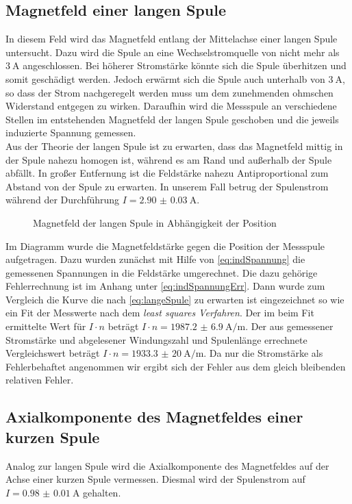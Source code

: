 \subsection{Magnetfeld einer langen Spule}
In diesem Feld wird das Magnetfeld entlang der Mittelachse einer langen Spule untersucht. Dazu wird die Spule an eine Wechselstromquelle von nicht mehr als $ \SI{3}{\ampere} $ angeschlossen. Bei höherer Stromstärke könnte sich die Spule überhitzen und somit geschädigt werden. Jedoch erwärmt sich die Spule auch unterhalb von $ \SI{3}{\ampere} $, so dass der Strom nachgeregelt werden muss um dem zunehmenden ohmschen Widerstand entgegen zu wirken. Daraufhin wird die Messspule an verschiedene Stellen im entstehenden Magnetfeld der langen Spule geschoben und die jeweils induzierte Spannung gemessen. \\
Aus der Theorie der langen Spule ist zu erwarten, dass das Magnetfeld mittig in der Spule nahezu homogen ist, während es am Rand und außerhalb der Spule abfällt. In großer Entfernung ist die Feldstärke nahezu Antiproportional zum Abstand von der Spule zu erwarten.
In unserem Fall betrug der Spulenstrom während der Durchführung $ I = \SI{2.90(3)}{\ampere} $. 

\begin{figure}[H]

\caption{Magnetfeld der langen Spule in Abhängigkeit der Position}
\end{figure}

Im Diagramm wurde die Magnetfeldstärke gegen die Position der Messspule aufgetragen. Dazu wurden zunächst mit Hilfe von \eqref{eq:indSpannung} die gemessenen Spannungen in die Feldstärke umgerechnet. Die dazu gehörige Fehlerrechnung ist im Anhang unter \eqref{eq:indSpannungErr}. Dann wurde zum Vergleich die Kurve die nach \eqref{eq:langeSpule} zu erwarten ist eingezeichnet so wie ein Fit der Messwerte nach dem \textit{least squares Verfahren}. Der im beim Fit ermittelte Wert für $ I\cdot n $ beträgt $ I\cdot n = \SI{1987.2(69)}{\ampere\per\meter} $. Der aus gemessener Stromstärke und abgelesener Windungszahl und Spulenlänge errechnete Vergleichswert beträgt $ I\cdot n = \SI{1933.3(200)}{\ampere\per\meter} $. Da nur die Stromstärke als Fehlerbehaftet angenommen wir ergibt sich der Fehler aus dem gleich bleibenden relativen Fehler.


\subsection{Axialkomponente des Magnetfeldes einer kurzen Spule}
Analog zur langen Spule wird die Axialkomponente des Magnetfeldes auf der Achse einer kurzen Spule vermessen. Diesmal wird der Spulenstrom auf $I=\SI{0.98(1)}{\ampere}$ gehalten.

